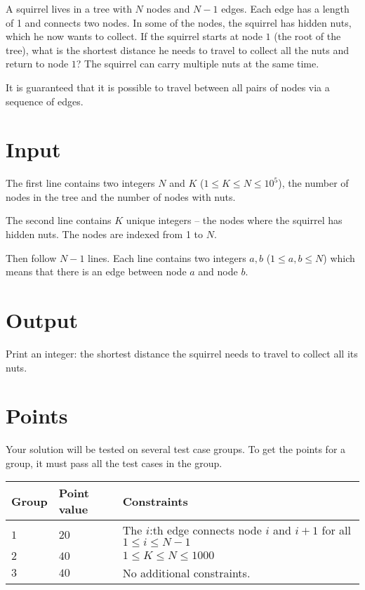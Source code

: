 
A squirrel lives in a tree with $N$ nodes and $N-1$ edges.
Each edge has a length of 1 and connects two nodes.
In some of the nodes, the squirrel has hidden nuts, which he now wants to collect.
If the squirrel starts at node $1$ (the root of the tree),
what is the shortest distance he needs to travel to collect all the nuts and return to node $1$?
The squirrel can carry multiple nuts at the same time.

It is guaranteed that it is possible to travel between all pairs of nodes via a sequence of edges.


\section*{Input}
The first line contains two integers $N$ and $K$ ($1 \leq K \leq N \leq 10^5$), the number of nodes
in the tree and the number of nodes with nuts.

The second line contains $K$ unique integers -- the nodes where the squirrel has hidden nuts. The nodes are indexed from 1 to $N$.

Then follow $N-1$ lines. Each line contains two integers $a,b$ ($1 \leq a, b \leq N$) which means that there
is an edge between node $a$ and node $b$.

\section*{Output}
Print an integer: the shortest distance the squirrel needs to travel to collect all its nuts.

\section*{Points}
Your solution will be tested on several test case groups.
To get the points for a group, it must pass all the test cases in the group.

\noindent
\begin{tabular}{| l | l | p{12cm} |}
  \hline
  \textbf{Group} & \textbf{Point value} & \textbf{Constraints} \\ \hline
  $1$    & $20$        &  The $i$:th edge connects node $i$ and $i+1$ for all $1\le i \le N-1$ \\ \hline 
  $2$    & $40$        &  $1 \le K \le N \le 1000$ \\ \hline
  $3$    & $40$        &  No additional constraints. \\ \hline
\end{tabular}

